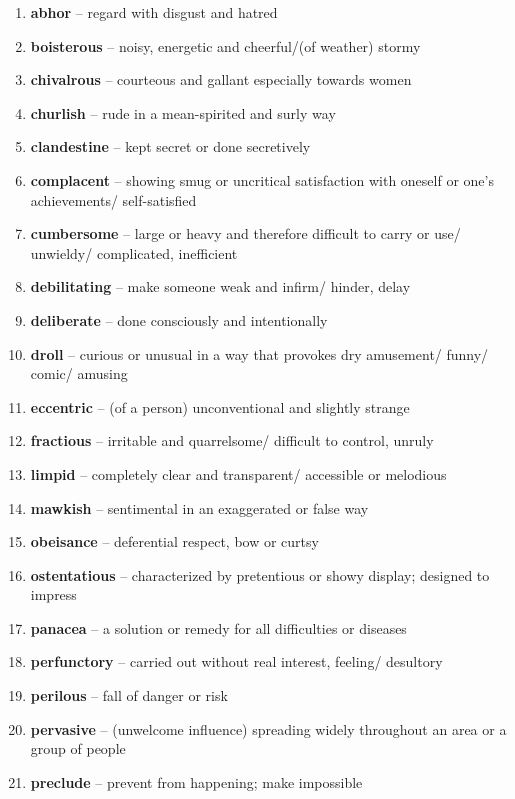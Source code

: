 \begin{enumerate}[wide,labelindent=0pt]
\item \textbf{abhor} -- regard with disgust and hatred
\item \textbf{boisterous} -- noisy, energetic and cheerful/(of weather) stormy
\item \textbf{chivalrous} -- courteous and gallant especially towards women
\item \textbf{churlish} -- rude in a mean-spirited and surly way
\item \textbf{clandestine} -- kept secret or done secretively
\item \textbf{complacent} -- showing smug or uncritical satisfaction with oneself or one's achievements/ self-satisfied
\item \textbf{cumbersome} -- large or heavy and therefore difficult to carry or use/ unwieldy/ complicated, inefficient
\item \textbf{debilitating} -- make someone weak and infirm/ hinder, delay
\item \textbf{deliberate} -- done consciously and intentionally
\item \textbf{droll} -- curious or unusual in a way that provokes dry amusement/ funny/ comic/ amusing
\item \textbf{eccentric} -- (of a person) unconventional and slightly strange
\item \textbf{fractious} -- irritable and quarrelsome/ difficult to control, unruly
\item \textbf{limpid} -- completely clear and transparent/ accessible or melodious
\item \textbf{mawkish} -- sentimental in an exaggerated or false way
\item \textbf{obeisance} -- deferential respect, bow or curtsy
\item \textbf{ostentatious} -- characterized by pretentious or showy display; designed to impress
\item \textbf{panacea} -- a solution or remedy for all difficulties or diseases
\item \textbf{perfunctory} -- carried out without real interest, feeling/ desultory
\item \textbf{perilous} -- fall of danger or risk
\item \textbf{pervasive} -- (unwelcome influence) spreading widely throughout an area or a group of people
\item \textbf{preclude} -- prevent from happening; make impossible

\end{enumerate}
